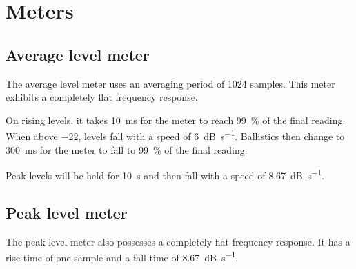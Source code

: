 



\chapter{Meters}
\label{chap:meters}

\section{Average level meter}

The average level meter uses an averaging period of \num{1024}
samples.  This meter exhibits a completely flat frequency response.

On rising levels, it takes \SI{10}{\milli\second} for the meter to
reach \SI{99}{\percent} of the final reading.  When above
\SI{-22}{\dBFS}, levels fall with a speed of \SI{6}{\dB\per\second}.
Ballistics then change to \SI{300}{\milli\second} for the meter to
fall to \SI{99}{\percent} of the final reading.

Peak levels will be held for \SI{10}{\second} and then fall with a
speed of \SI{8.67}{\dB\per\second}.

\section{Peak level meter}

The peak level meter also possesses a completely flat frequency
response.  It has a rise time of one sample and a fall time of
\SI{8.67}{\dB\per\second}.

